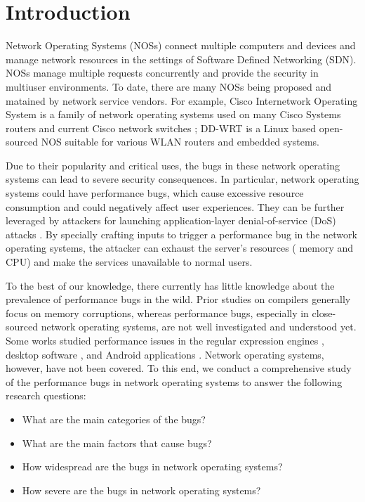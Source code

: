 \section{Introduction}
\label{s:intro}
Network Operating Systems (NOSs) connect multiple computers and devices and manage network resources in the settings of Software Defined Networking (SDN).
%
NOSs manage multiple requests concurrently and provide the security in multiuser environments. 
%
To date, there are many NOSs being proposed and matained by network service vendors.
%
For example, Cisco Internetwork Operating System is a family of network operating systems used on many Cisco Systems routers and current Cisco network switches \cite{edgeworth2014ip};
DD-WRT \cite{dd-wrt} is a Linux based open-sourced NOS suitable for various WLAN routers and embedded systems.
%
%

Due to their popularity and critical uses, the bugs in these network operating systems can lead to severe security consequences.
%
In particular, network operating systems could have performance bugs, which cause excessive resource consumption and could negatively affect user experiences.
%
They can be further leveraged by attackers for launching application-layer denial-of-service (DoS) attacks \cite{crosby2003algodos}.
%
By specially crafting inputs to trigger a performance bug in the network operating systems,
%
the attacker can exhaust the server's resources (\eg{,} memory and CPU) and make the services unavailable to normal users. 

%
To the best of our knowledge, there currently has little knowledge about the prevalence of performance bugs in the wild.
%
Prior studies on compilers generally focus on memory corruptions,
%
whereas performance bugs, especially in close-sourced network operating systems, are not well investigated and understood yet.
%
Some works studied performance issues in the regular expression engines \cite{shen2018rescue,wustholz2017static}, desktop software \cite{perfbugstudy}, and Android applications \cite{liu2014characterizing}.
%
Network operating systems, however, have not been covered.
%
To this end, we conduct a comprehensive study of the performance bugs in network operating systems to answer the following research questions:
%
\begin{itemize}[itemsep=0.5ex, parsep=0ex, leftmargin=3mm]
    \item What are the main categories of the bugs?
    \item What are the main factors that cause bugs?
    \item How widespread are the bugs in network operating systems?
    \item How severe are the bugs in network operating systems?
\end{itemize}

